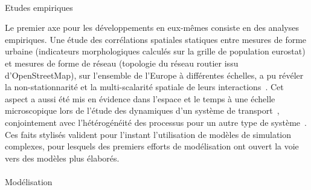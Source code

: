 \paragraph{}{Etudes empiriques}

Le premier axe pour les développements en eux-mêmes consiste en des analyses empiriques. Une étude des corrélations spatiales statiques entre mesures de forme urbaine (indicateurs morphologiques calculés sur la grille de population eurostat) et mesures de forme de réseau (topologie du réseau routier issu d'OpenStreetMap), sur l'ensemble de l'Europe à différentes échelles, a pu révéler la non-stationnarité et la multi-scalarité spatiale de leurs interactions~\cite{raimbault2016cautious}. Cet aspect a aussi été mis en évidence dans l'espace et le temps à une échelle microscopique lors de l'étude des dynamiques d'un système de transport~\cite{raimbault2016investigating}, conjointement avec l'hétérogénéité des processus pour un autre type de système~\cite{raimbault2015hybrid}. Ces faits stylisés valident pour l'instant l'utilisation de modèles de simulation complexes, pour lesquels des premiers efforts de modélisation ont ouvert la voie vers des modèles plus élaborés.


\paragraph{}{Modélisation}

